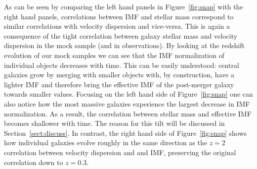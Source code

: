 \documentclass[usenatbib, letters]{mnras}
\def\aimf{\alpha_{\mathrm{IMF}}}
\def\Sref#1{Section~\ref{#1}\xspace}
\def\Fref#1{Figure~\ref{#1}\xspace}
\begin{document}
% 
%
As can be seen by comparing the left hand panels in \Fref{fig:snap} with the right hand panels, correlations between IMF and stellar mass correspond to similar correlations with velocity dispersion and vice-versa. This is again a consequence of the tight correlation between galaxy stellar mass and velocity dispersion in the mock sample (and in observations). 
By looking at the redshift evolution of our mock samples we can see that the IMF normalization of individual objects decreases with time. This can be easily understood: central galaxies grow by merging with smaller objects with, by construction, have a lighter IMF and therefore bring the effective IMF of the post-merger galaxy towards smaller values.
Focusing on the left hand side of \Fref{fig:snap} one can also notice how the most massive galaxies experience the largest decrease in IMF normalization. As a result, the correlation between stellar mass and effective IMF becomes shallower with time. The reason for this tilt will be discussed in \Sref{sect:discuss}.
In contrast, the right hand side of \Fref{fig:snap} shows how individual galaxies evolve roughly in the same direction as the $z=2$ correlation between velocity dispersion and and IMF, preserving the original correlation down to $z=0.3$.
\end{document}
